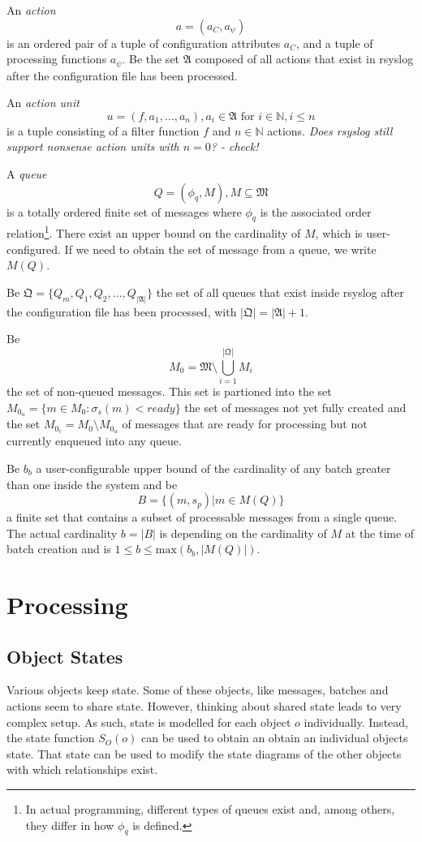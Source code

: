 \documentclass[a4paper,10pt]{article}
\newcommand{\IN}{\mathbb{N}}
\newcommand{\MM}{\mathfrak{M}}
\newcommand{\QQ}{\mathfrak{Q}}
\newcommand{\AAA}{\mathfrak{A}}
\begin{document}
An \emph{action}
$$a = (a_C, a_\psi)$$
is an ordered pair of a tuple of configuration attributes $a_C$, and a tuple of processing functions $a_\psi$. Be the set $\AAA$ composed of all actions that exist in rsyslog after the configuration file has been processed.

An \emph{action unit} 
$$u = (f, a_1, \ldots, a_n), a_i \in \AAA \text{ for } i \in \IN, i \le n$$
is a tuple consisting of a filter function $f$ and $n \in \IN$ actions. \emph{Does rsyslog still support nonsense action units with $n=0$? - check!}

A \emph{queue}
$$Q = (\phi_q, M), M \subseteq \MM$$
is a totally ordered finite set of messages where $\phi_q$ is the associated order relation\footnote{In actual programming, different types of queues exist and, among others, they differ in how $\phi_q$ is defined.}. There exist an upper bound on the cardinality of $M$, which is user-configured. If we need to obtain the set of message from a queue, we write $M(Q)$.

Be $\QQ = \{Q_m, Q_1, Q_2, \ldots, Q_{|\AAA|}\}$ the set of all queues that exist inside rsyslog after the configuration file has been processed, with $|\QQ| = |\AAA| + 1$.

Be
$$M_0 = \MM \setminus \bigcup_{i=1}^{|\QQ|} M_i$$
the set of non-queued messages. This set is partioned into the set $M_{0_u} = \{m \in M_0: \sigma_s(m) < ready\}$ the set of messages not yet fully created and the set $M_{0_r} = M_0 \setminus M_{0_u}$ of messages that are ready for processing but not currently enqueued into any queue.

Be $b_b$ a user-configurable upper bound of the cardinality of any batch greater than one inside the system and be
$$B = \{ (m, s_p) | m \in M(Q) \}$$
a finite set that contains a subset of processable messages from a single queue. The actual cardinality $b = |B|$ is depending on the cardinality of $M$ at the time of batch creation and is $1 \leq b \leq \text{max}(b_b, |M(Q)|)$. 

\section{Processing}
\subsection{Object States}
Various objects keep state. Some of these objects, like messages, batches and actions seem to share state. However, thinking about shared state leads to very complex setup. As such, state is modelled for each object $o$ individually. Instead, the state function $S_O(o)$ can be used to obtain an obtain an individual objects state. That state can be used to modify the state diagrams of the other objects with which relationships exist.
\end{document}
